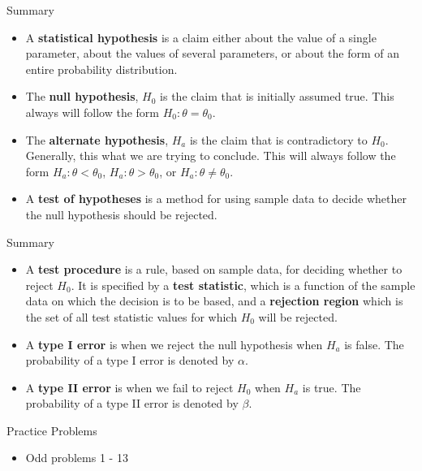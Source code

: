 \documentclass[
  ignorenonframetext,
]{beamer}
\providecommand{\tightlist}{%
  \setlength{\itemsep}{0pt}\setlength{\parskip}{0pt}}\usepackage{longtable,booktabs,array}
\begin{document}
\begin{frame}{Summary}
\protect\hypertarget{summary}{}
\begin{itemize}[<+->]
\tightlist
\item
  A \textbf{statistical hypothesis} is a claim either about the value of
  a single parameter, about the values of several parameters, or about
  the form of an entire probability distribution.
\item
  The \textbf{null hypothesis}, \(H_{0}\) is the claim that is initially
  assumed true. This always will follow the form
  \(H_{0}: \theta = \theta_{0}\).
\item
  The \textbf{alternate hypothesis}, \(H_{a}\) is the claim that is
  contradictory to \(H_{0}\). Generally, this what we are trying to
  conclude. This will always follow the form
  \(H_{a}: \theta < \theta_{0}\), \(H_{a}: \theta > \theta_{0}\), or
  \(H_{a}: \theta \neq \theta_{0}\).
\item
  A \textbf{test of hypotheses} is a method for using sample data to
  decide whether the null hypothesis should be rejected.
\end{itemize}
\end{frame}

\begin{frame}{Summary}
\protect\hypertarget{summary-1}{}
\begin{itemize}[<+->]
\tightlist
\item
  A \textbf{test procedure} is a rule, based on sample data, for
  deciding whether to reject \(H_{0}\). It is specified by a
  \textbf{test statistic}, which is a function of the sample data on
  which the decision is to be based, and a \textbf{rejection region}
  which is the set of all test statistic values for which \(H_{0}\) will
  be rejected.
\item
  A \textbf{type I error} is when we reject the null hypothesis when
  \(H_{a}\) is false. The probability of a type I error is denoted by
  \(\alpha\).
\item
  A \textbf{type II error} is when we fail to reject \(H_{0}\) when
  \(H_{a}\) is true. The probability of a type II error is denoted by
  \(\beta\).
\end{itemize}
\end{frame}

\begin{frame}{Practice Problems}
\protect\hypertarget{practice-problems}{}
\begin{itemize}[<+->]
\tightlist
\item
  Odd problems 1 - 13
\end{itemize}
\end{frame}
\end{document}
